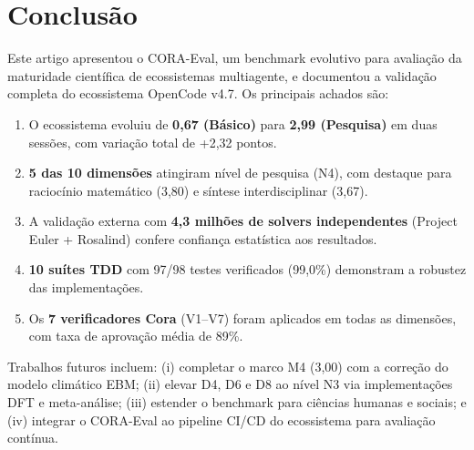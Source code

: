 \documentclass[12pt,a4paper]{article}
\begin{document}
\section{Conclusão}

Este artigo apresentou o CORA-Eval, um benchmark evolutivo para avaliação da
maturidade científica de ecossistemas multiagente, e documentou a validação
completa do ecossistema OpenCode v4.7. Os principais achados são:

\begin{enumerate}
\item O ecossistema evoluiu de \textbf{0,67 (Básico)} para \textbf{2,99 (Pesquisa)}
      em duas sessões, com variação total de +2,32 pontos.
\item \textbf{5 das 10 dimensões} atingiram nível de pesquisa (N4), com destaque
      para raciocínio matemático (3,80) e síntese interdisciplinar (3,67).
\item A validação externa com \textbf{4,3 milhões de solvers independentes}
      (Project Euler + Rosalind) confere confiança estatística aos resultados.
\item \textbf{10 suítes TDD} com 97/98 testes verificados (99,0\%) demonstram
      a robustez das implementações.
\item Os \textbf{7 verificadores Cora} (V1--V7) foram aplicados em todas as
      dimensões, com taxa de aprovação média de 89\%.
\end{enumerate}

Trabalhos futuros incluem: (i) completar o marco M4 (3,00) com a correção do
modelo climático EBM; (ii) elevar D4, D6 e D8 ao nível N3 via implementações
DFT e meta-análise; (iii) estender o benchmark para ciências humanas e sociais;
e (iv) integrar o CORA-Eval ao pipeline CI/CD do ecossistema para avaliação
contínua.
\end{document}
